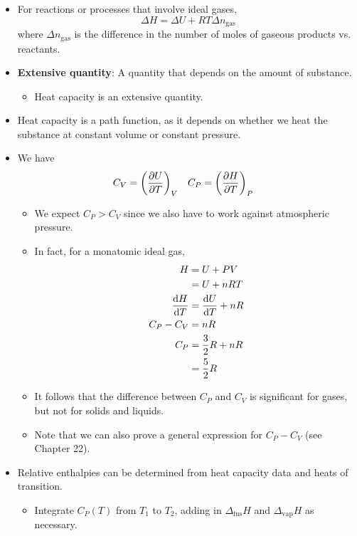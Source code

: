 \documentclass[../notes.tex]{subfiles}
\begin{document}
\begin{itemize}
\begin{itemize}
    \end{itemize}
    \item For reactions or processes that involve ideal gases,
    \begin{equation*}
        \Delta H = \Delta U+RT\Delta n_\text{gas}
    \end{equation*}
    where $\Delta n_\text{gas}$ is the difference in the number of moles of gaseous products vs. reactants.
    \item \textbf{Extensive quantity}: A quantity that depends on the amount of substance.
    \begin{itemize}
        \item Heat capacity is an extensive quantity.
    \end{itemize}
    \item Heat capacity is a path function, as it depends on whether we heat the substance at constant volume or constant pressure.
    \item We have
    \begin{align*}
        C_V &= \left( \pdv{U}{T} \right)_V&
        C_P &= \left( \pdv{H}{T} \right)_P
    \end{align*}
    \begin{itemize}
        \item We expect $C_P>C_V$ since we also have to work against atmospheric pressure.
        \item In fact, for a monatomic ideal gas,
        \begin{align*}
            H &= U+PV\\
            &= U+nRT\\
            \dv{H}{T} &= \dv{U}{T}+nR\\
            C_P-C_V &= nR\\
            C_P &= \frac{3}{2}R+nR\\
            &= \frac{5}{2}R
        \end{align*}
        \item It follows that the difference between $C_P$ and $C_V$ is significant for gases, but not for solids and liquids.
        \item Note that we can also prove a general expression for $C_P-C_V$ (see Chapter 22).
    \end{itemize}
    \item Relative enthalpies can be determined from heat capacity data and heats of transition.
    \begin{itemize}
        \item Integrate $C_P(T)$ from $T_1$ to $T_2$, adding in $\Delta_\text{fus}H$ and $\Delta_\text{vap}H$ as necessary.

\end{itemize}
\end{itemize}
\end{document}

